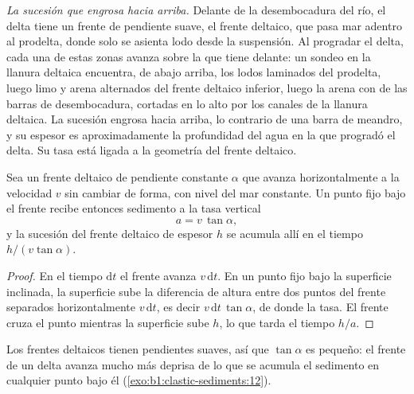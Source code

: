 \emph{La sucesión que engrosa hacia arriba.} Delante de la desembocadura del río, el delta tiene un frente de pendiente suave, el frente deltaico, que pasa mar adentro al
prodelta, donde solo se asienta lodo desde la suspensión. Al progradar el delta, cada una de estas zonas avanza sobre la que tiene delante: un sondeo en la llanura deltaica encuentra,
de abajo arriba, los lodos laminados del prodelta, luego limo y arena alternados del frente deltaico inferior, luego la arena con  de las barras de desembocadura,
cortadas en lo alto por los canales de la llanura deltaica. La sucesión engrosa hacia arriba, lo contrario de una barra de meandro, y su espesor es aproximadamente la profundidad del agua
en la que progradó el delta. Su tasa está ligada a la geometría del frente deltaico.

\begin{proposition}\label{prop:b1:clastic-sediments:progradation}
Sea un frente deltaico de pendiente constante $\alpha$ que avanza horizontalmente a la velocidad $v$ sin cambiar de forma, con nivel del mar constante. Un punto fijo bajo el frente
recibe entonces sedimento a la tasa vertical
\[
  a = v\,\tan\alpha,
\]
y la sucesión del frente deltaico de espesor $h$ se acumula allí en el tiempo $h/(v\tan\alpha)$.
\end{proposition}

\begin{proof}
En el tiempo $\mathrm dt$ el frente avanza $v\,\mathrm dt$. En un punto fijo bajo la superficie inclinada, la superficie sube la diferencia de altura entre dos puntos del frente separados
horizontalmente $v\,\mathrm dt$, es decir $v\,\mathrm dt\,\tan\alpha$, de donde la tasa. El frente cruza el punto mientras la superficie sube $h$, lo que tarda el tiempo $h/a$.
\end{proof}

Los frentes deltaicos tienen pendientes suaves, así que $\tan\alpha$ es pequeño: el frente de un delta avanza mucho más deprisa de lo que se acumula el sedimento en cualquier punto bajo él
(\cref{exo:b1:clastic-sediments:12}).


